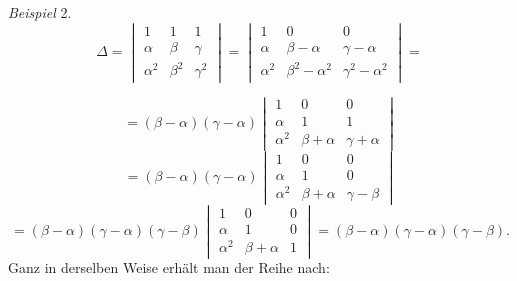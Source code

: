 \documentclass[11pt]{article}
\providecommand{\weberpage}[1]{}
\begin{document}
\textit{Beispiel} 2.
\[
\varDelta = \begin{vmatrix} 1 & 1 & 1\\ \alpha & \beta & \gamma\\ \alpha^2 & \beta^2 & \gamma^2\end{vmatrix}
= \begin{vmatrix} 1 & 0 & 0\\ \alpha & \beta-\alpha & \gamma-\alpha\\ \alpha^2 & \beta^2-\alpha^2 & \gamma^2-\alpha^2\end{vmatrix}
=
\]


\weberpage{44}
\[
= (\beta-\alpha)(\gamma-\alpha) \begin{vmatrix} 1 & 0 & 0\\ \alpha & 1 & 1\\ \alpha^2 & \beta+\alpha & \gamma+\alpha\end{vmatrix}
\]
\[
= (\beta-\alpha)(\gamma-\alpha) \begin{vmatrix} 1 & 0 & 0\\ \alpha & 1 & 0\\ \alpha^2 & \beta+\alpha & \gamma-\beta\end{vmatrix}
\]
\[
= (\beta-\alpha)(\gamma-\alpha)(\gamma-\beta) \begin{vmatrix} 1 & 0 & 0\\ \alpha & 1 & 0\\ \alpha^2 & \beta+\alpha & 1\end{vmatrix} = (\beta-\alpha)(\gamma-\alpha)(\gamma-\beta).
\]
Ganz in derselben Weise erhält man der Reihe nach:
\end{document}
